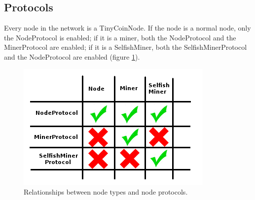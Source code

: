\documentclass{article}
\begin{document}
\subsection{Protocols}
Every node in the network is a TinyCoinNode. If the node is a normal node, only the NodeProtocol is enabled; if it is a miner, both the NodeProtocol and the MinerProtocol are enabled; if it is a SelfishMiner, both the SelfishMinerProtocol and the NodeProtocol are enabled (figure \ref{fig:protocols}).
\begin{figure}
\centerline{\includegraphics[scale=0.50]{protocols}}
\caption{Relationships between node types and node protocols.}
\label{fig:protocols}
\end{figure}
\end{document}
